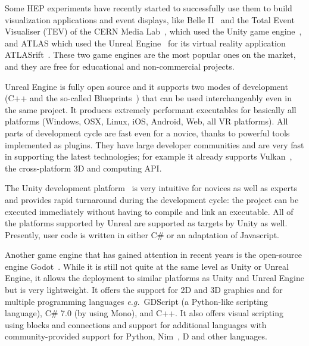 \documentclass[12pt,a4paper]{article}
\begin{document}
Some HEP experiments have recently started to successfully use them to build visualization applications and event displays,
like Belle II~\cite{BelleIIVR} and the Total Event Visualiser (TEV) of the CERN Media Lab~\cite{CERNTEV},
which used the Unity game engine~\cite{Unity3D}, and ATLAS which used the Unreal Engine~\cite{EpicUnreal} for
its virtual reality application ATLASrift~\cite{ATLASRift}. These two game engines are the most popular ones on the market, and they are
free for educational and non-commercial projects.

Unreal Engine is fully open source and it supports two modes of development (C++ and the so-called Blueprints~\cite{UnrealEngineBlueprints}) that can be used
interchangeably even in the same project. It produces extremely performant executables for basically all platforms
(Windows, OSX, Linux, iOS, Android, Web, all VR platforms). All parts of development cycle are fast even for a novice,
thanks to powerful tools implemented as plugins. They have large developer communities and are very fast in supporting the latest technologies;
for example it already supports Vulkan~\cite{vulkanAPI}, the cross-platform 3D and computing API.

The Unity development platform~\cite{Unity3D} is very intuitive for novices as
well as experts and provides rapid turnaround during the development cycle: the project can be executed immediately without having to
compile and link an executable. All of the platforms supported by Unreal are supported as targets by Unity as well. Presently, user code is written in either
C\# or an adaptation of Javascript.



Another game engine that has gained attention in recent years is the open-source engine Godot~\cite{Godot}.
While it is still not quite at the same level as Unity or Unreal Engine, it allows the deployment to similar platforms as Unity and Unreal
Engine but is very lightweight.
It offers the support for 2D and 3D graphics and for multiple programming languages {\it e.g.}\ GDScript (a Python-like scripting language),
 C\# 7.0 (by using Mono), and C++.
It also offers visual scripting using blocks and connections and support for additional languages with
community-provided support for Python, Nim~\cite{nimLang}, D and other languages.
\end{document}
